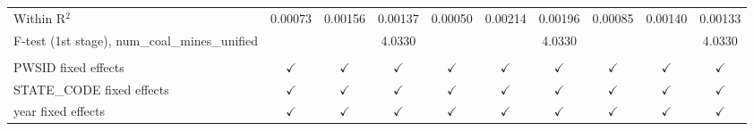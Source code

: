 \begin{table}[htbp]
\begin{adjustbox}{width = \textwidth, center}
\begin{tabular}{lccccccccc}
         Within R$^2$                                     & 0.00073       & 0.00156       & 0.00137       & 0.00050       & 0.00214        & 0.00196       & 0.00085       & 0.00140        & 0.00133\\  
         F-test (1st stage), num\_coal\_mines\_unified    &               &               & 4.0330        &               &                & 4.0330        &               &                & 4.0330\\  
          \\
         PWSID fixed effects                              & $\checkmark$  & $\checkmark$  & $\checkmark$  & $\checkmark$  & $\checkmark$   & $\checkmark$  & $\checkmark$  & $\checkmark$   & $\checkmark$\\   
         STATE\_CODE fixed effects                        & $\checkmark$  & $\checkmark$  & $\checkmark$  & $\checkmark$  & $\checkmark$   & $\checkmark$  & $\checkmark$  & $\checkmark$   & $\checkmark$\\   
         year fixed effects                               & $\checkmark$  & $\checkmark$  & $\checkmark$  & $\checkmark$  & $\checkmark$   & $\checkmark$  & $\checkmark$  & $\checkmark$   & $\checkmark$\\   
         \bottomrule
      \end{tabular}
   \end{adjustbox}
\end{table}


